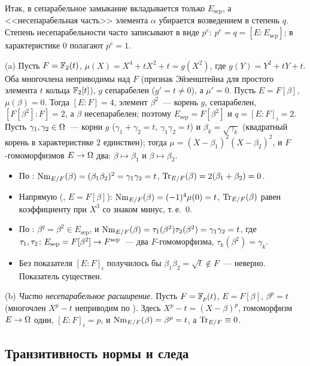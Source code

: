 Итак, в сепарабельное замыкание вкладывается только $E_{\mathrm{sep}}$, а <<несепарабельная часть>> элемента $\alpha$
убирается возведением в степень $q$. Степень несепарабельности часто записывают в виде $p^e$: $p^e=q=[E:E_{\mathrm{sep}}]$;
в характеристике $0$ полагают $p^e=1$.

\begin{example}[5.47d]
(a) Пусть $F=\mathbb F_2(t)$, $\mu(X)=X^4+tX^2+t=g(X^2)$, где $g(Y)=Y^2+tY+t$. Оба многочлена неприводимы над $F$ (признак
Эйзенштейна для простого элемента $t$ кольца $\mathbb F_2[t]$), $g$ сепарабелен ($g'=t\ne0$), а $\mu'=0$. Пусть $E=F[\beta]$,
$\mu(\beta)=0$. Тогда $[E:F]=4$, элемент $\beta^2$~--- корень $g$, сепарабелен, $[F[\beta^2]:F]=2$, а $\beta$
несепарабелен; поэтому $E_{\mathrm{sep}}=F[\beta^2]$ и $q=[E:F]_i=2$. Пусть $\gamma_1,\gamma_2\in\Omega$~--- корни $g$
($\gamma_1+\gamma_2=t$, $\gamma_1\gamma_2=t$) и $\beta_k=\sqrt{\gamma_k}$ (квадратный корень в характеристике $2$
единствен); тогда $\mu=(X-\beta_1)^2(X-\beta_2)^2$, и $F$-гомоморфизмов $E\to\Omega$ два: $\beta\mapsto\beta_1$ и
$\beta\mapsto\beta_2$.
\begin{itemize}[leftmargin=*]
\item По : $\operatorname{Nm}_{E/F}(\beta)=(\beta_1\beta_2)^2=\gamma_1\gamma_2=t$, $\operatorname{Tr}_{E/F}(\beta)=2(\beta_1+\beta_2)=0$.
\item Напрямую (, $E=F[\beta]$): $\operatorname{Nm}_{E/F}(\beta)=(-1)^4\mu(0)=t$, $\operatorname{Tr}_{E/F}(\beta)$ равен коэффициенту при $X^3$
со знаком минус, т.\,е.\ $0$.
\item По : $\beta^q=\beta^2\in E_{\mathrm{sep}}$, и $\operatorname{Nm}_{E/F}(\beta)=\tau_1(\beta^2)\tau_2(\beta^2)=\gamma_1\gamma_2=t$,
где $\tau_1,\tau_2\colon E_{\mathrm{sep}}=F[\beta^2]\to F^{\mathrm{sep}}$~--- два $F$-гомоморфизма, $\tau_k(\beta^2)=\gamma_k$.
\item Без показателя $[E:F]_i$ получилось бы $\beta_1\beta_2=\sqrt t\notin F$~--- неверно. Показатель существен.
\end{itemize}

(b) \emph{Чисто несепарабельное расширение.} Пусть $F=\mathbb F_p(t)$, $E=F[\beta]$, $\beta^p=t$ (многочлен $X^p-t$ неприводим
по ). Здесь $X^p-t=(X-\beta)^p$, гомоморфизм $E\to\Omega$ один, $[E:F]_i=p$, и $\operatorname{Nm}_{E/F}(\beta)=\beta^p=t$, а
$\operatorname{Tr}_{E/F}\equiv0$.
\end{example}

\subsection*{Транзитивность нормы и следа}

